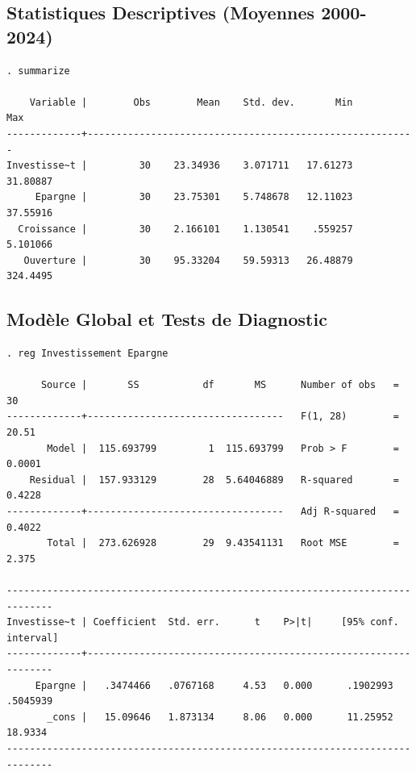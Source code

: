 \documentclass[12pt, a4paper]{article}
\begin{document}
{\footnotesize %

\subsection{Statistiques Descriptives (Moyennes 2000-2024)}
\begin{verbatim}
. summarize

    Variable |        Obs        Mean    Std. dev.       Min        Max
-------------+---------------------------------------------------------
Investisse~t |         30    23.34936    3.071711   17.61273   31.80887
     Epargne |         30    23.75301    5.748678   12.11023   37.55916
  Croissance |         30    2.166101    1.130541    .559257   5.101066
   Ouverture |         30    95.33204    59.59313   26.48879   324.4495
\end{verbatim}

\subsection{Modèle Global et Tests de Diagnostic}
\begin{verbatim}
. reg Investissement Epargne

      Source |       SS           df       MS      Number of obs   =        30
-------------+----------------------------------   F(1, 28)        =     20.51
       Model |  115.693799         1  115.693799   Prob > F        =    0.0001
    Residual |  157.933129        28  5.64046889   R-squared       =    0.4228
-------------+----------------------------------   Adj R-squared   =    0.4022
       Total |  273.626928        29  9.43541131   Root MSE        =     2.375

------------------------------------------------------------------------------
Investisse~t | Coefficient  Std. err.      t    P>|t|     [95% conf. interval]
-------------+----------------------------------------------------------------
     Epargne |   .3474466   .0767168     4.53   0.000      .1902993   .5045939
       _cons |   15.09646   1.873134     8.06   0.000      11.25952   18.9334
------------------------------------------------------------------------------


\end{verbatim}}
\end{document}

